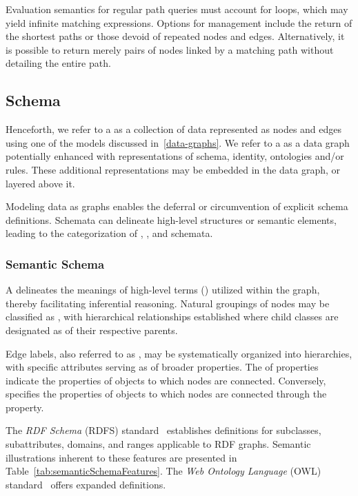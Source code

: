 Evaluation semantics for regular path queries must account for loops, which may yield infinite matching expressions. Options for management include the return of the shortest paths or those devoid of repeated nodes and edges. Alternatively, it is possible to return merely pairs of nodes linked by a matching path without detailing the entire path.

\subsection{Schema}\label{schema-identity-context}
Henceforth, we refer to a  as a collection of data represented as nodes and edges using one of the models discussed in~\ref{data-graphs}. We refer to a  as a data graph potentially enhanced with representations of schema, identity, ontologies and/or rules. These additional representations may be embedded in the data graph, or layered above it.

Modeling data as graphs enables the deferral or circumvention of explicit schema definitions. Schemata can delineate high-level structures or semantic elements, leading to the categorization of , , and  schemata.

\subsubsection{Semantic Schema}\label{schema_semantic}
A  delineates the meanings of high-level terms () utilized within the graph, thereby facilitating inferential reasoning. Natural groupings of nodes may be classified as , with hierarchical relationships established where child classes are designated as  of their respective parents.

Edge labels, also referred to as , may be systematically organized into hierarchies, with specific attributes serving as  of broader properties. The  of properties indicate the properties of objects to which nodes are connected. Conversely,  specifies the properties of objects to which nodes are connected through the property.

The \textit{RDF Schema} (RDFS) standard~\cite{Brickley2014RDFSchema1.1} establishes definitions for subclasses, subattributes, domains, and ranges applicable to RDF graphs. Semantic illustrations inherent to these features are presented in Table~\ref{tab:semanticSchemaFeatures}. The \textit{Web Ontology Language} (OWL) standard~\cite{Hitzler2014OWLPrimer} offers expanded definitions.

